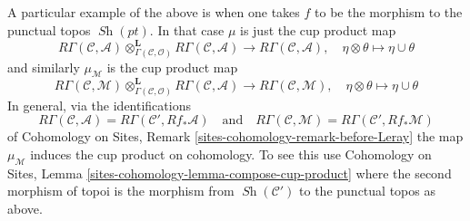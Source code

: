 \documentclass{stacks-project}
\theoremstyle{plain}
\theoremstyle{definition}
\theoremstyle{remark}
\numberwithin{equation}{subsection}
\def\Sh{\mathop{\mathit{Sh}}\nolimits}
\begin{document}
\medskip\noindent
A particular example of the above is when one takes $f$ to be the morphism
to the punctual topos $\Sh(pt)$. In that case $\mu$ is just the cup product
map
$$
R\Gamma(\mathcal{C}, \mathcal{A})
\otimes_{\Gamma(\mathcal{C}, \mathcal{O})}^\mathbf{L}
R\Gamma(\mathcal{C}, \mathcal{A})
\longrightarrow
R\Gamma(\mathcal{C}, \mathcal{A}),
\quad \eta \otimes \theta \mapsto \eta \cup \theta
$$
and similarly $\mu_\mathcal{M}$ is the cup product map
$$
R\Gamma(\mathcal{C}, \mathcal{M})
\otimes_{\Gamma(\mathcal{C}, \mathcal{O})}^\mathbf{L}
R\Gamma(\mathcal{C}, \mathcal{A})
\longrightarrow
R\Gamma(\mathcal{C}, \mathcal{M}),
\quad \eta \otimes \theta \mapsto \eta \cup \theta
$$
In general, via the identifications
$$
R\Gamma(\mathcal{C}, \mathcal{A}) =
R\Gamma(\mathcal{C}', Rf_*\mathcal{A})
\quad\text{and}\quad
R\Gamma(\mathcal{C}, \mathcal{M}) =
R\Gamma(\mathcal{C}', Rf_*\mathcal{M})
$$
of Cohomology on Sites, Remark \ref{sites-cohomology-remark-before-Leray}
the map $\mu_\mathcal{M}$ induces the cup product on cohomology.
To see this use
Cohomology on Sites, Lemma \ref{sites-cohomology-lemma-compose-cup-product}
where the second morphism of topoi is the morphism from $\Sh(\mathcal{C}')$
to the punctual topos as above.
\end{document}
